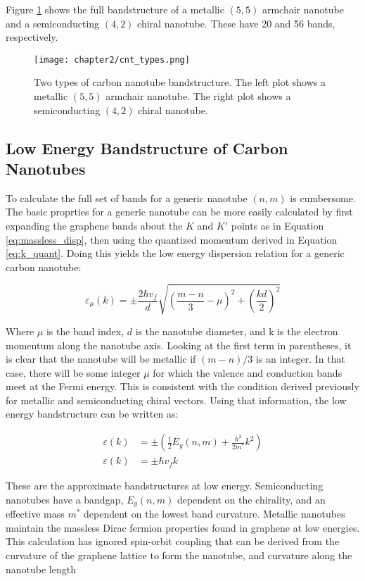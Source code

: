 Figure \ref{fig:cnt_types} shows the full bandstructure of a metallic $(5,5)$ armchair nanotube and a semiconducting $(4,2)$ chiral nanotube. These have 20 and 56 bands, respectively.

\begin{figure}
    \centering
    \texttt{[image: chapter2/cnt\_types.png]}
    \caption{Two types of carbon nanotube bandstructure. The left plot shows a metallic $(5,5)$ armchair nanotube. The right plot shows a semiconducting $(4,2)$ chiral nanotube.}
    \label{fig:cnt_types}
\end{figure}


\subsection{Low Energy Bandstructure of Carbon Nanotubes}

To calculate the full set of bands for a generic nanotube $(n,m)$ is cumbersome. The basic proprties for a generic nanotube can be more easily calculated by first expanding the graphene bands about the $K$ and $K'$ points as in Equation \ref{eq:massless_disp}, then using the quantized momentum derived in Equation \ref{eq:k_quant}. Doing this yields the low energy dispersion relation for a generic carbon nanotube:

\begin{equation}
    \varepsilon_{\mu}(k) = \pm\frac{2\hbar v_f}{d}\sqrt{\left(\frac{m-n}{3} - \mu\right)^2 + \left(\frac{kd}{2}\right)^2}
    \label{eq:low_e_cnt}
\end{equation}

Where $\mu$ is the band index, $d$ is the nanotube diameter, and k is the electron momentum along the nanotube axis. Looking at the first term in parentheses, it is clear that the nanotube will be metallic if $(m-n)/3$ is an integer. In that case, there will be some integer $\mu$ for which the valence and conduction bands meet at the Fermi energy. This is consistent with the condition derived previously for metallic and semiconducting chiral vectors. Using that information, the low energy bandstructure can be written as:

\begin{align}
    \varepsilon(k) &= \pm\left(\frac{1}{2}E_g(n,m) + \frac{\hbar^2}{2m^*}k^2\right) \\
    \varepsilon(k) &= \pm\hbar v_f k
\end{align}

These are the approximate bandstructures at low energy. Semiconducting nanotubes have a bandgap, $E_g(n,m)$ dependent on the chirality, and an effective mass $m^*$ dependent on the lowest band curvature. Metallic nanotubes maintain the massless Dirac fermion properties found in graphene at low energies. This calculation has ignored spin-orbit coupling that can be derived from the curvature of the graphene lattice to form the nanotube, and curvature along the nanotube length \cite{Jeong2009}

